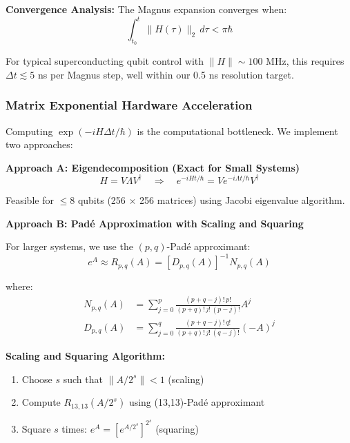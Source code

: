 \documentclass[12pt,a4paper]{article}
\begin{document}
\textbf{Convergence Analysis:} The Magnus expansion converges when:
\begin{equation}
\int_{t_0}^{t} \|H(\tau)\|_2 \, d\tau < \pi\hbar
\label{eq:magnus-convergence}
\end{equation}

For typical superconducting qubit control with $\|H\| \sim 100$ MHz, this requires $\Delta t \lesssim 5$ ns per Magnus step, well within our 0.5 ns resolution target.

\subsubsection{Matrix Exponential Hardware Acceleration}

Computing $\exp(-iH\Delta t/\hbar)$ is the computational bottleneck. We implement two approaches:

\textbf{Approach A: Eigendecomposition (Exact for Small Systems)}
\begin{equation}
H = V\Lambda V^\dagger \quad \Rightarrow \quad e^{-iHt/\hbar} = V e^{-i\Lambda t/\hbar} V^\dagger
\label{eq:eigendecomp}
\end{equation}

Feasible for $\leq 8$ qubits (256 $\times$ 256 matrices) using Jacobi eigenvalue algorithm.

\textbf{Approach B: Padé Approximation with Scaling and Squaring}

For larger systems, we use the $(p,q)$-Padé approximant:
\begin{equation}
e^{A} \approx R_{p,q}(A) = \left[D_{p,q}(A)\right]^{-1} N_{p,q}(A)
\label{eq:pade}
\end{equation}

where:
\begin{align}
N_{p,q}(A) &= \sum_{j=0}^{p} \frac{(p+q-j)! \, p!}{(p+q)! \, j! \, (p-j)!} A^j \\
D_{p,q}(A) &= \sum_{j=0}^{q} \frac{(p+q-j)! \, q!}{(p+q)! \, j! \, (q-j)!} (-A)^j
\end{align}

\textbf{Scaling and Squaring Algorithm:}
\begin{enumerate}[noitemsep]
    \item Choose $s$ such that $\|A/2^s\| < 1$ (scaling)
    \item Compute $R_{13,13}(A/2^s)$ using (13,13)-Padé approximant
    \item Square $s$ times: $e^A = \left[e^{A/2^s}\right]^{2^s}$ (squaring)
\end{enumerate}
\end{document}
